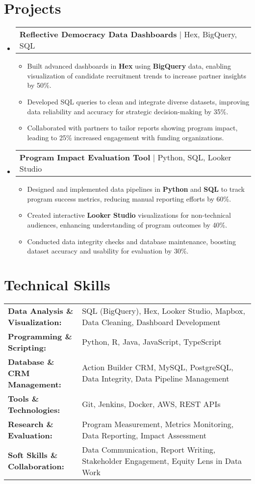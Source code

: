 \documentclass[letterpaper,11pt]{article}
\makeatletter
\newcommand{\resumeItem}[1]{
  \item\footnotesize{
    {#1 \vspace{-2pt}}
  }
}
\newcommand{\resumeProjectHeading}[2]{
    \item
    \begin{tabular*}{1.001\textwidth}{l@{\extracolsep{\fill}}r}
      \small#1 & \textbf{\small #2}\\
    \end{tabular*}\vspace{-7pt}
}
\newcommand{\resumeSubHeadingListStart}{\begin{itemize}[leftmargin=0pt, label={}]}
\newcommand{\resumeSubHeadingListEnd}{\end{itemize}}
\newcommand{\resumeItemListStart}{\begin{itemize}[leftmargin=*]}
\newcommand{\resumeItemListEnd}{\end{itemize}\vspace{-5pt}}
\makeatother
\begin{document}
\section{Projects}
    \vspace{-5pt}
    \resumeSubHeadingListStart
      \resumeProjectHeading
          {\textbf{Reflective Democracy Data Dashboards} | Hex, BigQuery, SQL}{}
          \resumeItemListStart
              \resumeItem{Built advanced dashboards in \textbf{Hex} using \textbf{BigQuery} data, enabling visualization of candidate recruitment trends to increase partner insights by 50\%.}
              \resumeItem{Developed SQL queries to clean and integrate diverse datasets, improving data reliability and accuracy for strategic decision-making by 35\%.}
              \resumeItem{Collaborated with partners to tailor reports showing program impact, leading to 25\% increased engagement with funding organizations.}
          \resumeItemListEnd
          \vspace{-16pt}
      \resumeProjectHeading
          {\textbf{Program Impact Evaluation Tool} | Python, SQL, Looker Studio}{}
          \resumeItemListStart
              \resumeItem{Designed and implemented data pipelines in \textbf{Python} and \textbf{SQL} to track program success metrics, reducing manual reporting efforts by 60\%.}
              \resumeItem{Created interactive \textbf{Looker Studio} visualizations for non-technical audiences, enhancing understanding of program outcomes by 40\%.}
              \resumeItem{Conducted data integrity checks and database maintenance, boosting dataset accuracy and usability for evaluation by 30\%.}
          \resumeItemListEnd 
    \resumeSubHeadingListEnd
\vspace{-10pt}
\section{Technical Skills}
        \vspace{-14pt}
        \begin{table}[h]
            \footnotesize
            \begin{tabular}{p{0.3\linewidth} p{0.7\linewidth}}
                \textbf{Data Analysis \& Visualization:} & SQL (BigQuery), Hex, Looker Studio, Mapbox, Data Cleaning, Dashboard Development \\
                \textbf{Programming \& Scripting:} & Python, R, Java, JavaScript, TypeScript \\
                \textbf{Database \& CRM Management:} & Action Builder CRM, MySQL, PostgreSQL, Data Integrity, Data Pipeline Management \\
                \textbf{Tools \& Technologies:} & Git, Jenkins, Docker, AWS, REST APIs \\
                \textbf{Research \& Evaluation:} & Program Measurement, Metrics Monitoring, Data Reporting, Impact Assessment \\
                \textbf{Soft Skills \& Collaboration:} & Data Communication, Report Writing, Stakeholder Engagement, Equity Lens in Data Work \\
            \end{tabular}
        \end{table}
\end{document}
